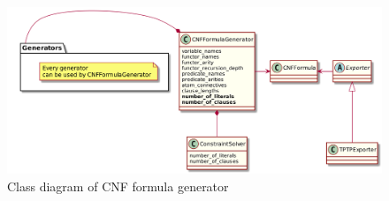 \begin{figure}[h]
\begin{centering}
  \includegraphics[width=\textwidth]{logic-formula-generator/cnf_formula_generator.png}
  \caption{Class diagram of CNF formula generator}
  \label{pic:cnf_generator_class_diagram}
\end{centering}
\end{figure}


